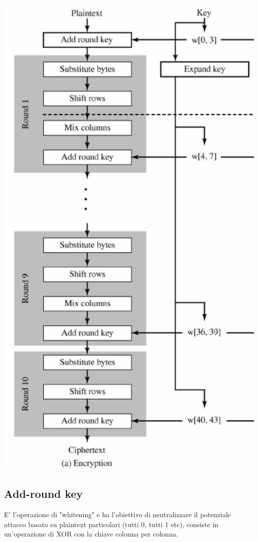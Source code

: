 \documentclass[11pt, oneside]{article}   	%
\begin{document}
\begin{center}
\includegraphics[scale= 0.4]{AES}
\end{center}
\subsection*{Add-round key}
E' l'operazione di "whitening" e ha l'obiettivo di neutralizzare il potenziale attacco basato su plaintext particolari (tutti 0, tutti 1 etc), consiste in un'operazione di XOR con la chiave colonna per colonna.\\\\
\end{document}
